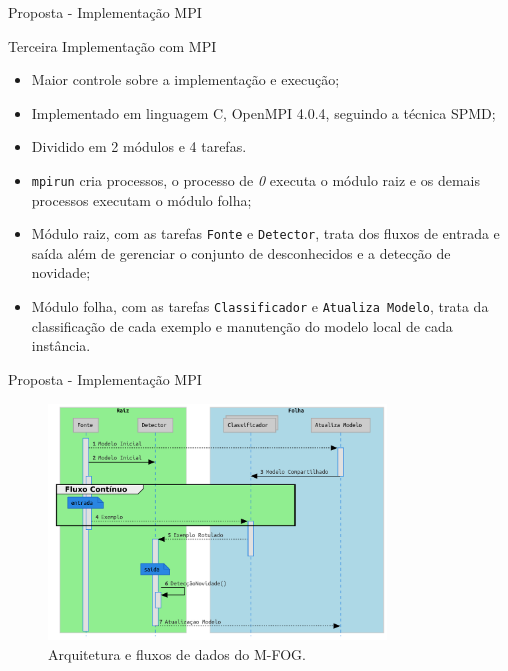 \documentclass[aspectratio=1610,10pt]{beamer}
\newcommand{\fonte}[1]{\vspace{-1em}{\footnotesize\textbf{Fonte:} #1}}
\newcommand{\mfog}{M-FOG\xspace}
\begin{document}
\begin{frame}[fragile]{Proposta - Implementação MPI}
\begin{block}{Terceira Implementação com MPI}
  \begin{itemize}%
    \item Maior controle sobre a implementação e execução;
    \item Implementado em linguagem C, OpenMPI 4.0.4, seguindo a técnica SPMD;
    \item Dividido em 2 módulos e 4 tarefas.
    \item \texttt{mpirun} cria processos, o processo de \emph{0} executa o
    módulo raiz e os demais processos executam o módulo folha;
    \item Módulo raiz, com as tarefas \texttt{Fonte} e \texttt{Detector}, trata
    dos fluxos de entrada e saída além de gerenciar o conjunto de desconhecidos
    e a detecção de novidade;
    \item Módulo folha, com as tarefas \texttt{Classificador} e \texttt{Atualiza Modelo},
    trata da classificação de cada exemplo e manutenção do modelo local de cada instância.
  \end{itemize}
\end{block}
\end{frame}

\begin{frame}[fragile]{Proposta - Implementação MPI}
  \begin{figure}[h]
    \centering
    \vspace{-0.5em}
    \includegraphics[width=0.8\textwidth,page=1]{figures/lifecycle-uml-svg.pdf}
    \vspace{-0.5em}
    \caption{Arquitetura e fluxos de dados do \mfog.}
    \vspace{-0.5em}
    \fonte{O autor.}
    \label{fig:arch}
  \end{figure}
\end{frame}
\end{document}
